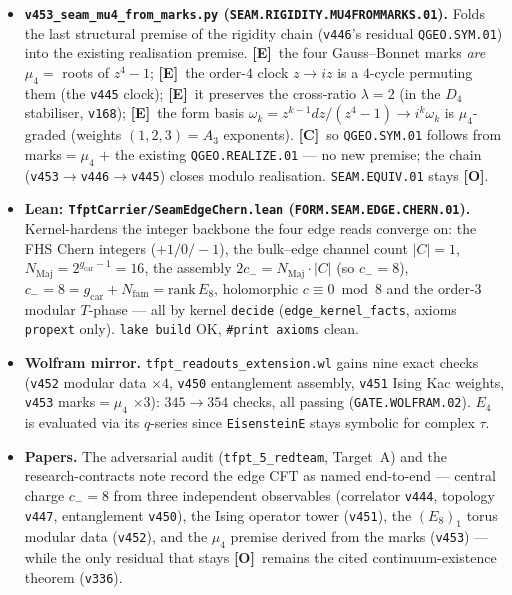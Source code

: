 \documentclass[11pt]{article}
\providecommand{\mE}{\textbf{[E]}}\providecommand{\mC}{\textbf{[C]}}
\providecommand{\mO}{\textbf{[O]}}\providecommand{\mX}{\textbf{[X]}}
\providecommand{\gcar}{g_{\mathrm{car}}}\providecommand{\Nfam}{N_{\mathrm{fam}}}
\begin{document}
\begin{itemize}
signature, extending \texttt{v156}'s $q$-expansion to the transformation data. \mE\ the character
$\chi{=}E_4/\eta^8$ is $S$-invariant $\chi(-1/\tau){=}\chi(\tau)$ (one primary, $S{=}[1]$); \mE\ $T$-phase
$\chi(\tau{+}1)/\chi(\tau){=}e^{-2\pi i/3}{=}e^{-2\pi i c/24}$ ($c{=}8$); \mE\ leading power $\chi\,q^{1/3}\to1$ so
$q^{-c/24}{=}q^{-1/3}\Rightarrow c{=}8$; \mE\ holomorphic $c{=}8\equiv0\bmod8$ with $T$-phase order
$24/\gcd(8,24){=}3$. \mC\ the $(E_8)_1$ identity is now pinned on the torus \emph{and} the edge. \texttt{SEAM.EQUIV.01}
stays \mO.
\item \textbf{\texttt{v453\_seam\_mu4\_from\_marks.py} (\texttt{SEAM.RIGIDITY.MU4FROMMARKS.01}).} Folds the last
structural premise of the rigidity chain (\texttt{v446}'s residual \texttt{QGEO.SYM.01}) into the existing
realisation premise. \mE\ the four Gauss--Bonnet marks \emph{are} $\mu_4{=}$ roots of $z^4{-}1$; \mE\ the order-$4$
clock $z\!\to\!iz$ is a $4$-cycle permuting them (the \texttt{v445} clock); \mE\ it preserves the cross-ratio
$\lambda{=}2$ (in the $D_4$ stabiliser, \texttt{v168}); \mE\ the form basis $\omega_k{=}z^{k-1}dz/(z^4{-}1)\to
i^k\omega_k$ is $\mu_4$-graded (weights $(1,2,3){=}A_3$ exponents). \mC\ so \texttt{QGEO.SYM.01} follows from
marks$=\mu_4$ $+$ the existing \texttt{QGEO.REALIZE.01} --- no new premise; the chain
(\texttt{v453}$\to$\texttt{v446}$\to$\texttt{v445}) closes modulo realisation. \texttt{SEAM.EQUIV.01} stays \mO.
\item \textbf{Lean: \texttt{TfptCarrier/SeamEdgeChern.lean} (\texttt{FORM.SEAM.EDGE.CHERN.01}).} Kernel-hardens the
integer backbone the four edge reads converge on: the FHS Chern integers ($+1/0/-1$), the bulk--edge channel count
$|C|{=}1$, $N_{\mathrm{Maj}}{=}2^{\gcar-1}{=}16$, the assembly $2c_-{=}N_{\mathrm{Maj}}\cdot|C|$ (so $c_-{=}8$),
$c_-{=}8{=}\gcar{+}\Nfam{=}\mathrm{rank}\,E_8$, holomorphic $c\equiv0\bmod8$ and the order-$3$ modular $T$-phase ---
all by kernel \texttt{decide} (\texttt{edge\_kernel\_facts}, axioms \texttt{propext} only). \texttt{lake build} OK,
\texttt{\#print axioms} clean.
\item \textbf{Wolfram mirror.} \texttt{tfpt\_readouts\_extension.wl} gains nine exact checks (\texttt{v452} modular
data $\times4$, \texttt{v450} entanglement assembly, \texttt{v451} Ising Kac weights, \texttt{v453} marks$=\mu_4$
$\times3$): $345\to354$ checks, all passing (\texttt{GATE.WOLFRAM.02}). $E_4$ is evaluated via its $q$-series since
\texttt{EisensteinE} stays symbolic for complex $\tau$.
\item \textbf{Papers.} The adversarial audit (\texttt{tfpt\_5\_redteam}, Target~A) and the research-contracts note
record the edge CFT as named end-to-end --- central charge $c_-{=}8$ from three independent observables (correlator
\texttt{v444}, topology \texttt{v447}, entanglement \texttt{v450}), the Ising operator tower (\texttt{v451}), the
$(E_8)_1$ torus modular data (\texttt{v452}), and the $\mu_4$ premise derived from the marks (\texttt{v453}) --- while
the only residual that stays \mO\ remains the cited continuum-existence theorem (\texttt{v336}).
\end{itemize}
\end{document}
